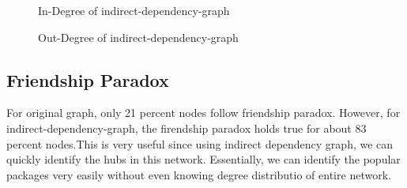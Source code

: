 \begin{figure}[indegree]
\centering
{}
\caption{In-Degree of indirect-dependency-graph}
\label{fig:indegree}
\end{figure}

\begin{figure}[outdegree]
\centering
{}
\caption{Out-Degree of indirect-dependency-graph}
\label{fig:outdegree}
\end{figure}


\subsection{Friendship Paradox} \label{friend}
For original graph, only 21 percent nodes follow friendship paradox. However,
 for
indirect-dependency-graph, the firendship paradox holds true for about 83
percent
nodes.This is very useful since using indirect dependency graph, we can
quickly identify the hubs in this network. Essentially, we can identify the
popular packages very easily without even knowing degree distributio of
entire network.

